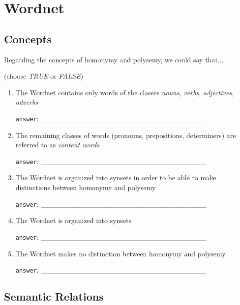 \documentclass[a4paper,11pt]{scrartcl}
\begin{document}
\section{Wordnet}

\subsection{Concepts}

Regarding the concepts of homonymy and polysemy, we could say that...

(choose \textit{TRUE} or \textit{FALSE})


\begin{enumerate}[label=\alph*)]
\singlespacing%

\item The Wordnet contains only words of the classes
      \textit{nouns}, \textit{verbs}, \textit{adjectives}, \textit{adverbs}

\verb|answer|: \_\_\_\_\_\_\_\_\_\_\_\_\_\_\_\_\_\_\_\_\_\_\_\_\_\_\_\_\_\_\_\_

\item The remaining classes of words (pronouns, prepositions, determiners) are
      referred to as \textit{content words}

\verb|answer|: \_\_\_\_\_\_\_\_\_\_\_\_\_\_\_\_\_\_\_\_\_\_\_\_\_\_\_\_\_\_\_\_

\item The Wordnet is organized into synsets in order to be able to make
      distinctions between homonymy and polysemy

\verb|answer|: \_\_\_\_\_\_\_\_\_\_\_\_\_\_\_\_\_\_\_\_\_\_\_\_\_\_\_\_\_\_\_\_

\item The Wordnet is organized into synsets

\verb|answer|: \_\_\_\_\_\_\_\_\_\_\_\_\_\_\_\_\_\_\_\_\_\_\_\_\_\_\_\_\_\_\_\_

\item The Wordnet makes no distinction between homonymy and polysemy

\verb|answer|: \_\_\_\_\_\_\_\_\_\_\_\_\_\_\_\_\_\_\_\_\_\_\_\_\_\_\_\_\_\_\_\_

\end{enumerate}


\subsection{Semantic Relations}
\end{document}
